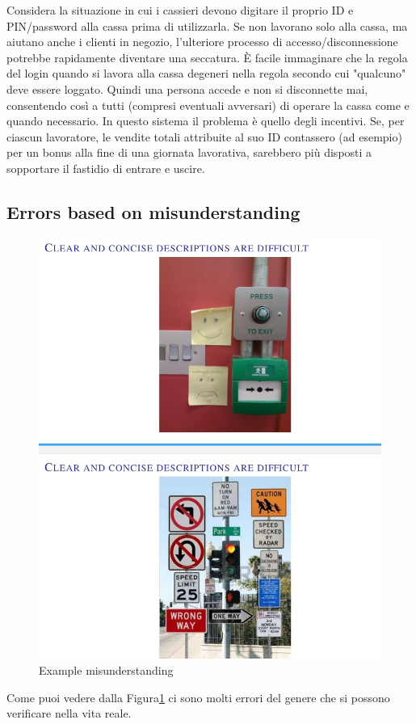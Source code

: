 \documentclass[11pt]{article}
\theoremstyle{definition} \newtheorem{definizione}{Definizione}[section] %
\begin{document}
    Considera la situazione in cui i cassieri devono digitare il proprio ID e PIN/password alla cassa prima di utilizzarla. 
    Se non lavorano solo alla cassa, ma aiutano anche i clienti in negozio, l'ulteriore processo di accesso/disconnessione potrebbe rapidamente diventare una seccatura. 
    È facile immaginare che la regola del login quando si lavora alla cassa degeneri nella regola secondo cui "qualcuno" deve essere loggato. 
    Quindi una persona accede e non si disconnette mai, consentendo così a tutti (compresi eventuali avversari) di operare la cassa come e quando necessario. 
    In questo sistema il problema è quello degli incentivi. 
    Se, per ciascun lavoratore, le vendite totali attribuite al suo ID contassero (ad esempio) per un bonus alla fine di una giornata lavorativa, sarebbero più disposti a sopportare il fastidio di entrare e uscire.
    
    \subsection{Errors based on misunderstanding}
    \begin{figure}[H]
        \centering
        \includegraphics[width=0.4\linewidth]{2.jpg} 
        \caption{Example misunderstanding}\label{fig:figura2}
    \end{figure}

    Come puoi vedere dalla Figura\ref{fig:figura2} ci sono molti errori del genere che si possono verificare nella vita reale. 
\end{document}
